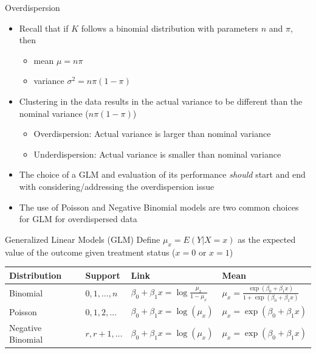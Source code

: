 \documentclass[xcolor=x11names,compress]{beamer}\usepackage[]{graphicx}\usepackage[]{color}
\begin{document}
\begin{frame}{Overdispersion}
  \begin{itemize}
  \item Recall that if $K$ follows a binomial distribution with parameters $n$ and $\pi$, then
    \begin{itemize}
    \item mean $\mu=n\pi$
    \item variance $\sigma^2=n\pi(1-\pi)$
    \end{itemize}
  \item Clustering in the data results in the actual variance to be different than the nominal variance ($n\pi(1-\pi)$)
    \begin{itemize}
    \item Overdispersion: Actual variance is larger than nominal variance
    \item Underdispersion: Actual variance is smaller than nominal variance
    \end{itemize}
  \item The choice of a GLM and evaluation of its performance {\it should} start and end with considering/addressing the overdispersion issue
    \item The use of Poisson and Negative Binomial models are two common choices for GLM for overdispersed data
  \end{itemize}
\end{frame}


\begin{frame}{Generalized Linear Models (GLM)}
  Define $\mu_x=E(Y|X=x)$ as the expected value of the outcome given treatment status ($x=0$ or $x=1$)  
  \begin{table}
    \footnotesize
    \centering
    \begin{tabular}{llll}\hline
      Distribution&Support&Link&Mean\\\hline\hline
      Binomial&$0,1,\ldots,n$&$\beta_0+\beta_1 x = \log \frac{\mu_x}{1-\mu_x}$&$\mu_x=\frac{\exp(\beta_0+\beta_1 x)}{1+\exp(\beta_0+\beta_1 x)}$\\\hline
      Poisson&$0,1,2,\ldots$&$\beta_0+\beta_1 x=\log(\mu_x)$&$\mu_x=\exp(\beta_0+\beta_1 x)$\\\hline
      Negative Binomial&$r,r+1,\ldots$&$\beta_0+\beta_1 x=\log(\mu_x)$&$\mu_x=\exp(\beta_0+\beta_1 x)$\\\hline
    \end{tabular}
  \end{table}
\end{frame}
\end{document}
